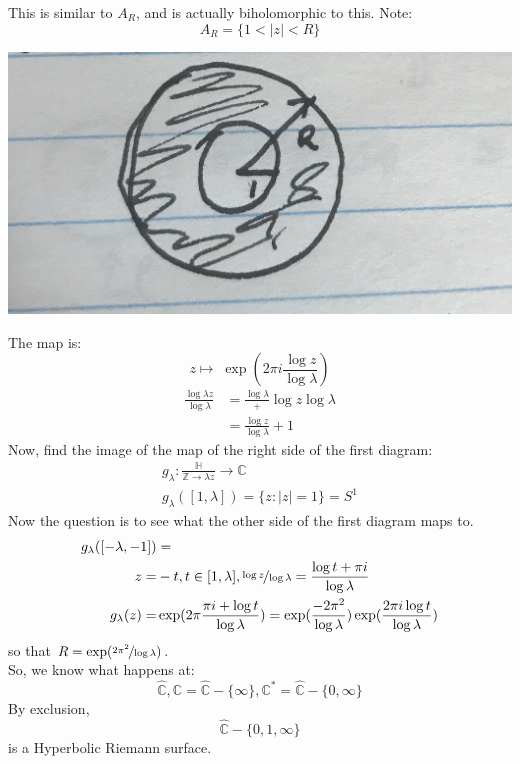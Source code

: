 \documentclass[a4paper, 11pt]{book}
\theoremstyle{definition}
\theoremstyle{remark}
\begin{document}
    This is similar to $A_R$, and is actually biholomorphic to this. Note:
    \[ A_R = \{1 < |z| < R\} \]
    \begin{center}
        \includegraphics[scale=0.05]{IMG_1021}
    \end{center}
    The map is:
    \[ z\mapsto\;\exp(2\pi i\frac{\log z}{\log \lambda}) \]
    \begin{align*}
        \frac{\log{\lambda z}}{\log{\lambda}} &= \frac{\log{\lambda}} + \log{z}{\log{\lambda}} \\
        &= \frac{\log{z}}{\log{\lambda}}+1
    \end{align*}
    Now, find the image of the map of the right side of the first diagram:
    \begin{align*}
        g_{\lambda}: \frac{\mathbb{H}}{\mathbb{Z}\to\lambda z}\to \mathbb{C} \\
        g_{\lambda}([1,\lambda]) = \{z: |z|=1\} = S^1
    \end{align*}
    Now the question is to see what the other side of the first diagram maps to.
    \begin{align*}
        g_{\lambda}([-\lambda,-1]) &=\\
        z = &-t, t\in[1,\lambda],\nicefrac{\log z}{\log \lambda} = \frac{\log t + \pi i}{\log \lambda} \\
        g_{\lambda}(z) = &\exp(2\pi \frac{\pi i + \log t}{\log \lambda}) = \exp(\frac{-2\pi^2}{\log \lambda})
        \exp(\frac{2\pi i\log t}{\log \lambda})
    \end{align*}
    so that $R = \exp(\nicefrac{2\pi^2}{\log{\lambda}})$.\\

    So, we know what happens at:
    \[ \hat{\mathbb{C}},\mathbb{C} = \hat{\mathbb{C}} - \{\infty\}, \mathbb{C}^* = \hat{\mathbb{C}}-\{0,\infty\} \]
    By exclusion,
    \[ \hat{\mathbb{C}}-\{0,1,\infty\} \]
    is a Hyperbolic Riemann surface.\\
\end{document}
